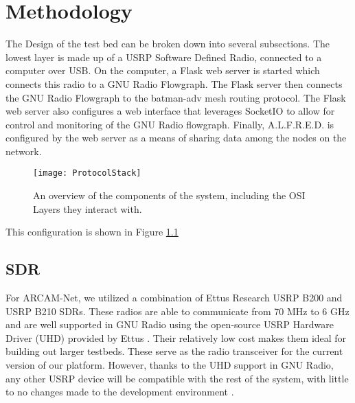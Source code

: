 
\chapter{Methodology} %

\label{Chapter3} %




The Design of the test bed can be broken down into several subsections. The lowest layer is made up of a USRP Software Defined Radio, connected to a computer over USB. On the computer, a Flask web server is started which connects this radio to a GNU Radio Flowgraph. The Flask server then connects the GNU Radio Flowgraph to the batman-adv mesh routing protocol. The Flask web server also configures a web interface that leverages SocketIO to allow for control and monitoring of the GNU Radio flowgraph. Finally, A.L.F.R.E.D. is configured by the web server as a means of sharing data among the nodes on the network. 

\begin{figure}
	\centering
	\texttt{[image: ProtocolStack]}
	\caption{An overview of the components of the system, including the OSI Layers they interact with.\cite{0003} \cite{0007} \cite{0008} \cite{0015} \cite{0012} \cite{0011}}
	\label{fig:ProtocolStack}
\end{figure}

This configuration is shown in Figure \ref{fig:ProtocolStack}

\section{SDR}

For ARCAM-Net, we utilized a combination of Ettus Research USRP B200 and USRP B210 SDRs. These radios are able to communicate from 70 MHz to 6 GHz and are well supported in GNU Radio using the open-source USRP Hardware Driver (UHD) provided by Ettus \cite{0007}. Their relatively low cost makes them ideal for building out larger testbeds. These serve as the radio transceiver for the current version of our platform. However, thanks to the UHD support in GNU Radio, any other USRP device will be compatible with the rest of the system, with little to no changes made to the development environment \cite{6737601}. 

